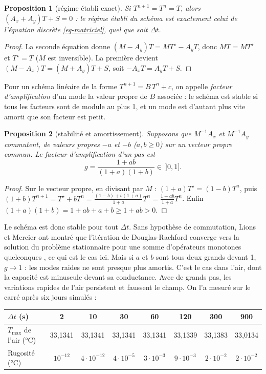 \documentclass[11pt,a4paper]{article}
\newtheorem{proposition}{Proposition}
\theoremstyle{definition}
\theoremstyle{remark}
\newcommand{\dt}{\Delta t}
\begin{document}
\begin{proposition}[régime établi exact]
Si $T^{n+1} = T^n = T$, alors $(A_x+A_y)T + S = 0$ : le régime établi du schéma est
exactement celui de l'équation discrète \eqref{eq-matriciel}, quel que soit $\dt$.
\end{proposition}

\begin{proof}
La seconde équation donne $(M-A_y)T = MT^\star - A_yT$, donc $MT = MT^\star$ et
$T^\star = T$ ($M$ est inversible). La première devient
$(M-A_x)T = (M+A_y)T + S$, soit $-A_xT = A_yT + S$.
\end{proof}

Pour un schéma linéaire de la forme $T^{n+1} = B\,T^n + c$, on appelle
\emph{facteur d'amplification} d'un mode la valeur propre de $B$ associée : le
schéma est stable si tous les facteurs sont de module au plus 1, et un mode est
d'autant plus vite amorti que son facteur est petit.

\begin{proposition}[stabilité et amortissement]
Supposons que $M^{-1}A_x$ et $M^{-1}A_y$ commutent, de valeurs propres $-a$ et $-b$
($a,b\ge0$) sur un vecteur propre commun. Le facteur d'amplification d'un pas est
\[
g = \frac{1 + ab}{(1+a)(1+b)} \in\ ]0,1].
\]
\end{proposition}

\begin{proof}
Sur le vecteur propre, en divisant par $M$ : $(1+a)T^\star = (1-b)T^n$, puis
$(1+b)T^{n+1} = T^\star + bT^n = \frac{(1-b) + b(1+a)}{1+a}T^n = \frac{1+ab}{1+a}T^n$.
Enfin $(1+a)(1+b) = 1+ab+a+b \ge 1+ab > 0$.
\end{proof}

Le schéma est donc stable pour tout $\dt$. Sans hypothèse de commutation, Lions et
Mercier ont montré que l'itération de Douglas-Rachford converge vers la solution du
problème stationnaire pour une somme d'opérateurs monotones quelconques
\cite{lions1979}, ce qui est le cas ici. Mais si $a$ et $b$ sont tous deux grands
devant 1, $g\to1$ : les modes raides ne sont presque plus amortis. C'est le cas dans
l'air, dont la capacité est minuscule devant sa conductance. Avec de grands pas,
les variations rapides de l'air persistent et faussent le champ. On l'a mesuré sur le
carré après six jours simulés :

\begin{center}
\begin{tabular}{lccccccc}
\toprule
$\dt$ (s) & 2 & 10 & 30 & 60 & 120 & 300 & 900\\
\midrule
$T_{\max}$ de l'air (°C) & 33,1341 & 33,1341 & 33,1341 & 33,1341 & 33,1339 & 33,1383 & 33,0134\\
Rugosité (°C) & $10^{-12}$ & $4\cdot10^{-12}$ & $4\cdot10^{-5}$ & $3\cdot10^{-3}$ & $9\cdot10^{-3}$ & $2\cdot10^{-2}$ & $2\cdot10^{-2}$\\
\bottomrule
\end{tabular}
\end{center}
\end{document}
